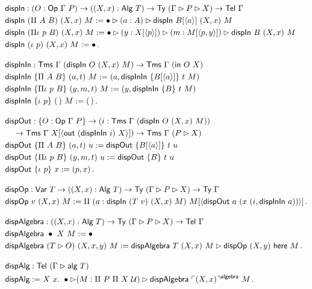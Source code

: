 \begin{fleqn}
\begin{align*}
&\mta{dispIn} : (O : \mta{Op}\ \Gamma\ P) \to ((X, x) : \mta{Alg}\ T) \to \mta{Ty}\ (\Gamma \rhd P \rhd X) \to \Tel\ \Gamma \\
&\mta{dispIn}\ (\Pi\ A\ B)\ (X, x)\ M := \bullet \rhd (a : A) \rhd \mta{dispIn}\ B[\Msub a]\ (X, x)\ M \\
&\mta{dispIn}\ (\Pi\iota\ p\ B)\ (X, x)\ M := \bullet \rhd (y : X[\Msub p]) \rhd (m : M[\Msub{p, y}]) \rhd \mta{dispIn}\ B\ (X, x)\ M \\
&\mta{dispIn}\ (\iota\ p)\ (X, x)\ M := \bullet \,. \\[1em]
&\mta{dispInIn} : \Tms\ \Gamma\ (\mta{dispIn}\ O\ (X, x)\ M) \to \Tms\ \Gamma\ (\mta{in}\ O\ X) \\
&\mta{dispInIn}\ \{\Pi\ A\ B\}\ (a, t)\ M := (a, \mta{dispInIn}\ \{B[\Msub a]\}\ t\ M) \\
&\mta{dispInIn}\ \{\Pi\iota\ p\ B\}\ (y, m, t)\ M := (y,\mta{dispInIn}\ \{B\}\ t\ M) \\
&\mta{dispInIn}\ \{\iota\ p\}\ (\,)\ M := (\,) \,. \\[1em]
&\mta{dispOut} : \{O : \Op\ \Gamma\ P\} \to (i : \Tms\ \Gamma\ (\mta{dispIn}\ O\ (X, x)\ M)) \\
&\quad\to \Tms\ \Gamma\ X[\Msub{\mta{out}\ (\mta{dispInIn}\ i)\ X}]) \to \Tms\ \Gamma\ (P \rhd X) \\
&\mta{dispOut}\ \{\Pi\ A\ B\}\ (a, t)\ u := \mta{dispOut}\ \{B[\Msub a]\}\ t\ u \\
&\mta{dispOut}\ \{\Pi\iota\ p\ B\}\ (y, m, t)\ u := \mta{dispOut}\ \{B\}\ t\ u \\
&\mta{dispOut}\ \{\iota\ p\}\ x := (p, x) \,. \\[1em]
&\mta{dispOp} : \mta{Var}\ T \to ((X, x) : \mta{Alg}\ T) \to \mta{Ty}\ (\Gamma \rhd P \rhd X) \to \Ty\ \Gamma \\
&\mta{dispOp}\ v\ (X, x)\ M := \Pi\ (a : \mta{dispIn}\ (T\ v)\ (X, x)\ M)\ M[\Msub{\mta{dispOut}\ a\ (x\ (i, \mta{dispInIn}\ a))}]\, . \\[1em]
&\mta{dispAlgebra} : ((X, x) : \mta{Alg}\ T) \to \mta{Ty}\ (\Gamma \rhd P \rhd X) \to \Tel\ \Gamma \\
&\mta{dispAlgebra}\ \bullet\ X\ M := \bullet \\
&\mta{dispAlgebra}\ (T \rhd O)\ (X, x, y)\ M := \mta{dispAlgebra}\ T\ (X, x)\ M \rhd \mta{dispOp}\ (X, y)\ \mta{here}\ M \,. \\[1em]
&\mta{dispAlg} : \Tel\ (\Gamma \rhd \mta{alg}\ T) \\
&\mta{dispAlg} := X\ x.\ \bullet \rhd (M : \Pi\ P\ \Pi\ X\ \univ) \rhd \mta{dispAlgebra}\ \emb{(X, x)}^{\mta{algebra}}\ M \,.
\end{align*}
\end{fleqn}


